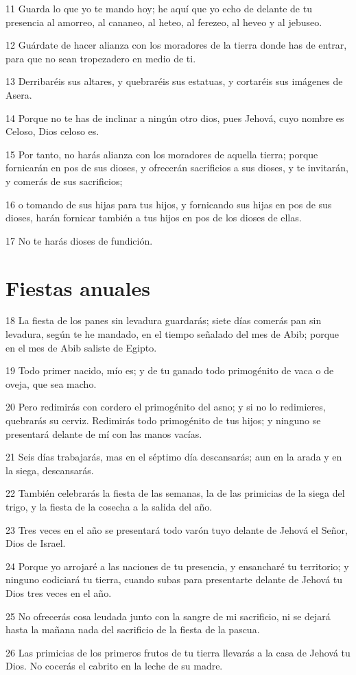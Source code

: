 \par 11 Guarda lo que yo te mando hoy; he aquí que yo echo de delante de tu presencia al amorreo, al cananeo, al heteo, al ferezeo, al heveo y al jebuseo.
\par 12 Guárdate de hacer alianza con los moradores de la tierra donde has de entrar, para que no sean tropezadero en medio de ti.
\par 13 Derribaréis sus altares, y quebraréis sus estatuas, y cortaréis sus imágenes de Asera.
\par 14 Porque no te has de inclinar a ningún otro dios, pues Jehová, cuyo nombre es Celoso, Dios celoso es.
\par 15 Por tanto, no harás alianza con los moradores de aquella tierra; porque fornicarán en pos de sus dioses, y ofrecerán sacrificios a sus dioses, y te invitarán, y comerás de sus sacrificios;
\par 16 o tomando de sus hijas para tus hijos, y fornicando sus hijas en pos de sus dioses, harán fornicar también a tus hijos en pos de los dioses de ellas.
\par 17 No te harás dioses de fundición.

\section*{Fiestas anuales}

\par 18 La fiesta de los panes sin levadura guardarás; siete días comerás pan sin levadura, según te he mandado, en el tiempo señalado del mes de Abib; porque en el mes de Abib saliste de Egipto.
\par 19 Todo primer nacido, mío es; y de tu ganado todo primogénito de vaca o de oveja, que sea macho.
\par 20 Pero redimirás con cordero el primogénito del asno; y si no lo redimieres, quebrarás su cerviz. Redimirás todo primogénito de tus hijos; y ninguno se presentará delante de mí con las manos vacías.
\par 21 Seis días trabajarás, mas en el séptimo día descansarás; aun en la arada y en la siega, descansarás.
\par 22 También celebrarás la fiesta de las semanas, la de las primicias de la siega del trigo, y la fiesta de la cosecha a la salida del año.
\par 23 Tres veces en el año se presentará todo varón tuyo delante de Jehová el Señor, Dios de Israel.
\par 24 Porque yo arrojaré a las naciones de tu presencia, y ensancharé tu territorio; y ninguno codiciará tu tierra, cuando subas para presentarte delante de Jehová tu Dios tres veces en el año.
\par 25 No ofrecerás cosa leudada junto con la sangre de mi sacrificio, ni se dejará hasta la mañana nada del sacrificio de la fiesta de la pascua.
\par 26 Las primicias de los primeros frutos de tu tierra llevarás a la casa de Jehová tu Dios. No cocerás el cabrito en la leche de su madre.

